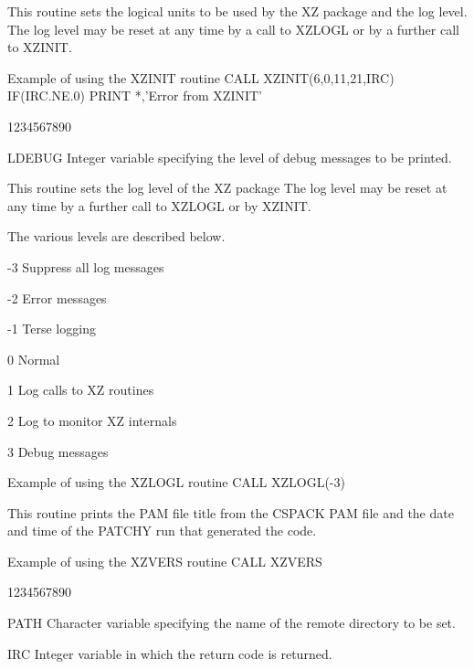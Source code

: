 \par
This routine sets the logical units to be used by the XZ package
and the log level. The log level may be reset at any time by
a call to XZLOGL or by a further call to XZINIT.
\begin{XMPt}{Example of using the XZINIT routine}
      CALL XZINIT(6,0,11,21,IRC)
      IF(IRC.NE.0) PRINT *,'Error from XZINIT'
\end{XMPt}
\begin{DLtt}{1234567890}
\item[LDEBUG]Integer variable specifying the level of debug messages
to be printed.
\end{DLtt}
\par
This routine sets the log level of the XZ package
The log level may be reset at any time by
a further call to XZLOGL or by XZINIT.
\par
The various levels are described below.
\begin{UL}
\item
-3 Suppress all log messages
\item
-2 Error messages
\item
-1 Terse logging
\item
 0 Normal
\item
 1 Log calls to XZ routines
\item
 2 Log to monitor XZ internals
\item
 3 Debug messages
\end{UL}
\begin{XMPt}{Example of using the XZLOGL routine}
      CALL XZLOGL(-3)
\end{XMPt}
\par
This routine prints the PAM file title from the CSPACK
PAM file and the date and time of the PATCHY run
that generated the code.
\begin{XMPt}{Example of using the XZVERS routine}
      CALL XZVERS
\end{XMPt}
\begin{DLtt}{1234567890}
\item[PATH]Character variable specifying the name of the remote directory
to be set.
\item[IRC]Integer variable in which the return code is returned.
\end{DLtt}
